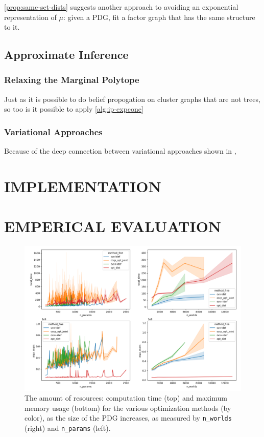 \documentclass[twoside]{article}
\begin{document}
\cref{prop:same-set-dists} suggests another approach to avoiding an exponential representation of $\mu$: given a PDG, fit a factor graph that has the same structure to it. 

\subsection{Approximate Inference}
\subsubsection{Relaxing the Marginal Polytope}
Just as it is possible to do belief propogation on cluster graphs that are not trees,
so too is it possible to apply 
\cref{alg:ip-expcone}

\subsubsection{Variational Approaches}

Because of the deep connection between variational approaches 
shown in \parencite{one-true-loss}, 



\section{IMPLEMENTATION} \label{sec:implementation}
\section{EMPERICAL EVALUATION} \label{sec:expts}

\begin{figure}
    \includegraphics[width=\linewidth]{figs/resources-fine}
    \caption{
        The amount of resources: computation time (top) and maximum memory usage (bottom) for the various optimization methods (by color), as the size of the PDG increases, as measured by \texttt{n\_worlds} (right) and \texttt{n\_params} (left).
     }\label{fig:resources}
\end{figure}
\end{document}
